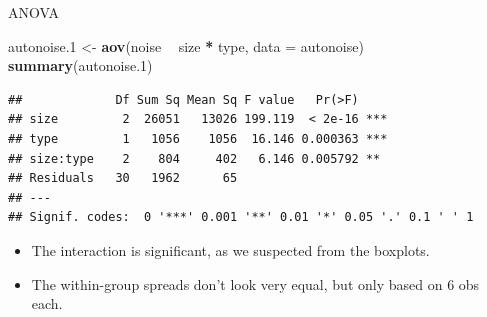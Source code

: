 \documentclass[ignorenonframetext,]{beamer}
\newenvironment{Shaded}{\begin{snugshade}}{\end{snugshade}}
\newcommand{\DataTypeTok}[1]{\textcolor[rgb]{0.13,0.29,0.53}{#1}}
\newcommand{\FloatTok}[1]{\textcolor[rgb]{0.00,0.00,0.81}{#1}}
\newcommand{\KeywordTok}[1]{\textcolor[rgb]{0.13,0.29,0.53}{\textbf{#1}}}
\newcommand{\NormalTok}[1]{#1}
\newcommand{\OperatorTok}[1]{\textcolor[rgb]{0.81,0.36,0.00}{\textbf{#1}}}
\newcommand{\StringTok}[1]{\textcolor[rgb]{0.31,0.60,0.02}{#1}}
\begin{document}
\begin{frame}[fragile]{ANOVA}
\protect\hypertarget{anova}{}

\begin{Shaded}
\begin{Highlighting}[]
\NormalTok{autonoise}\FloatTok{.1}\NormalTok{ <-}\StringTok{ }\KeywordTok{aov}\NormalTok{(noise }\OperatorTok{~}\StringTok{ }\NormalTok{size }\OperatorTok{*}\StringTok{ }\NormalTok{type, }\DataTypeTok{data =}\NormalTok{ autonoise)}
\KeywordTok{summary}\NormalTok{(autonoise}\FloatTok{.1}\NormalTok{)}
\end{Highlighting}
\end{Shaded}

\begin{verbatim}
##             Df Sum Sq Mean Sq F value   Pr(>F)    
## size         2  26051   13026 199.119  < 2e-16 ***
## type         1   1056    1056  16.146 0.000363 ***
## size:type    2    804     402   6.146 0.005792 ** 
## Residuals   30   1962      65                     
## ---
## Signif. codes:  0 '***' 0.001 '**' 0.01 '*' 0.05 '.' 0.1 ' ' 1
\end{verbatim}

\begin{itemize}
\item
  The interaction is significant, as we suspected from the boxplots.
\item
  The within-group spreads don't look very equal, but only based on 6
  obs each.
\end{itemize}

\end{frame}
\end{document}
